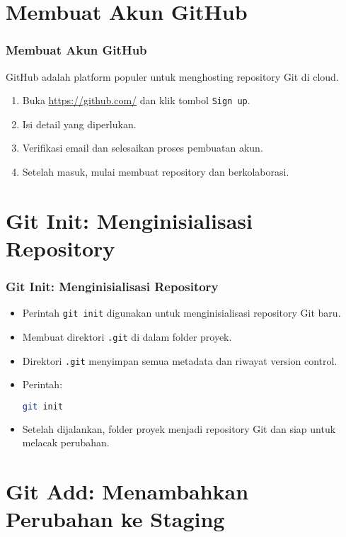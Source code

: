 \documentclass[aspectratio=169, table]{beamer}
\begin{document}
\section{Membuat Akun GitHub}

\begin{frame}[fragile]
\frametitle{Membuat Akun GitHub}
GitHub adalah platform populer untuk menghosting repository Git di cloud.
\begin{enumerate}
\item Buka \url{https://github.com/} dan klik tombol \texttt{Sign up}.
\item Isi detail yang diperlukan.
\item Verifikasi email dan selesaikan proses pembuatan akun.
\item Setelah masuk, mulai membuat repository dan berkolaborasi.
\end{enumerate}
\end{frame}

\section{Git Init: Menginisialisasi Repository}

\begin{frame}[fragile]
\frametitle{Git Init: Menginisialisasi Repository}
\vspace{15pt}
\begin{itemize}
\item Perintah \texttt{git init} digunakan untuk menginisialisasi repository Git baru.
\item Membuat direktori \texttt{.git} di dalam folder proyek.
\item Direktori \texttt{.git} menyimpan semua metadata dan riwayat version control.
\item Perintah:
\begin{lstlisting}[language=bash]
git init
\end{lstlisting}
\item Setelah dijalankan, folder proyek menjadi repository Git dan siap untuk melacak perubahan.
\end{itemize}
\end{frame}

\section{Git Add: Menambahkan Perubahan ke Staging}
\end{document}
